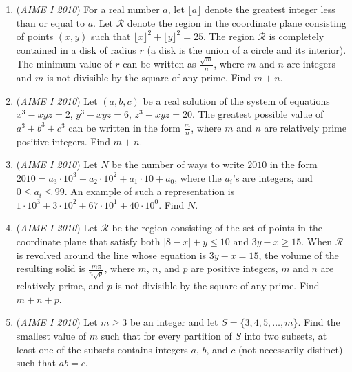 \begin{enumerate}
 \textbf{Note}: $|S|$ represents the number of elements in the set $S$.


 

	\item (\textit{AIME I 2010}) For a real number $a$, let $\lfloor a \rfloor$ denote the greatest integer less than or equal to $a$. Let $\mathcal{R}$ denote the region in the coordinate plane consisting of points $(x,y)$ such that $\lfloor x \rfloor ^2 + \lfloor y \rfloor ^2 = 25$. The region $\mathcal{R}$ is completely contained in a disk of radius $r$ (a disk is the union of a circle and its interior). The minimum value of $r$ can be written as $\frac {\sqrt {m}}{n}$, where $m$ and $n$ are integers and $m$ is not divisible by the square of any prime. Find $m + n$.


 

	\item (\textit{AIME I 2010}) Let $(a,b,c)$ be a real solution of the system of equations $x^3 - xyz = 2$, $y^3 - xyz = 6$, $z^3 - xyz = 20$. The greatest possible value of $a^3 + b^3 + c^3$ can be written in the form $\frac {m}{n}$, where $m$ and $n$ are relatively prime positive integers. Find $m + n$.


 

	\item (\textit{AIME I 2010}) Let $N$ be the number of ways to write $2010$ in the form $2010 = a_3 \cdot 10^3 + a_2 \cdot 10^2 + a_1 \cdot 10 + a_0$, where the $a_i$'s are integers, and $0 \le a_i \le 99$. An example of such a representation is $1\cdot 10^3 + 3\cdot 10^2 + 67\cdot 10^1 + 40\cdot 10^0$. Find $N$.


 

	\item (\textit{AIME I 2010}) Let $\mathcal{R}$ be the region consisting of the set of points in the coordinate plane that satisfy both $|8 - x| + y \le 10$ and $3y - x \ge 15$. When $\mathcal{R}$ is revolved around the line whose equation is $3y - x = 15$, the volume of the resulting solid is $\frac {m\pi}{n\sqrt {p}}$, where $m$, $n$, and $p$ are positive integers, $m$ and $n$ are relatively prime, and $p$ is not divisible by the square of any prime. Find $m + n + p$.


 

	\item (\textit{AIME I 2010}) Let $m \ge 3$ be an integer and let $S = \{3,4,5,\ldots,m\}$. Find the smallest value of $m$ such that for every partition of $S$ into two subsets, at least one of the subsets contains integers $a$, $b$, and $c$ (not necessarily distinct) such that $ab = c$.



\end{enumerate}
